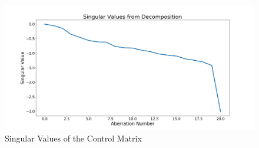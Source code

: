 \begin{figure}[H]
    \centering
    \includegraphics[width = 14cm]{Figures/singular_values.png}
    \caption{Singular Values of the Control Matrix}
    \label{fig:SVD}
\end{figure}

